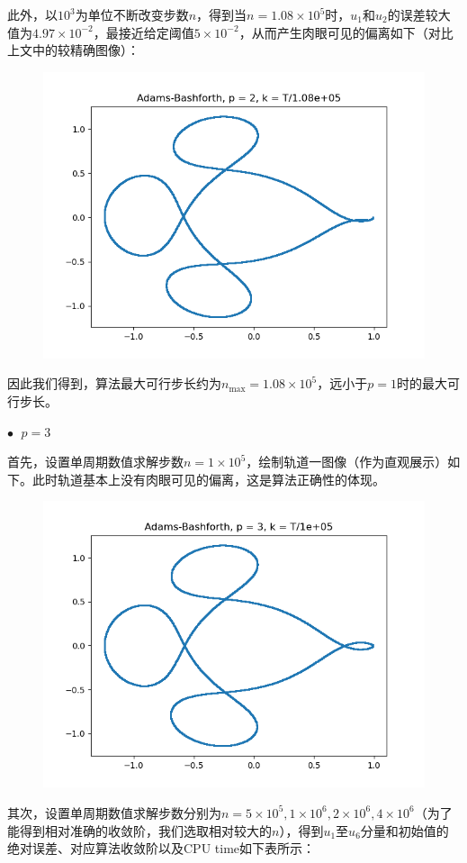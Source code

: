 \documentclass{ctexart}
\begin{document}
\begin{sloppypar}
此外，以$10^3$为单位不断改变步数$n$，得到当$n = 1.08 \times 10^5$时，$u_1$和$u_2$的误差较大值为$4.97 \times 10^{-2}$，最接近给定阈值$5 \times 10^{-2}$，从而产生肉眼可见的偏离如下（对比上文中的较精确图像）：
\begin{figure}[H]
\centering
\includegraphics[scale = 0.45]{./report_src/Figure_4.png}
\end{figure}
因此我们得到，算法最大可行步长约为$n_{\max} = 1.08 \times 10^5$，远小于$p=1$时的最大可行步长。

$\bullet \;$ $p = 3$

首先，设置单周期数值求解步数$n = 1 \times 10^5$，绘制轨道一图像（作为直观展示）如下。此时轨道基本上没有肉眼可见的偏离，这是算法正确性的体现。
\begin{figure}[H]
\centering
\includegraphics[scale = 0.45]{./report_src/Figure_5.png}
\end{figure}
其次，设置单周期数值求解步数分别为$n = 5 \times 10^5,1 \times 10^6,2 \times 10^6, 4 \times 10^6$（为了能得到相对准确的收敛阶，我们选取相对较大的$n$），得到$u_1$至$u_6$分量和初始值的绝对误差、对应算法收敛阶以及CPU time如下表所示：


\end{sloppypar}
\end{document}
